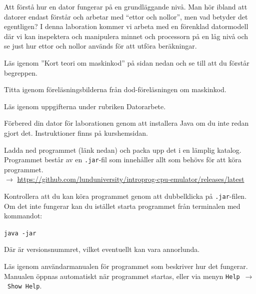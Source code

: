 
\Lab{\LabWeekTWOdod}
\begin{Goals}
\item Att förstå hur en dator fungerar på en grundläggande nivå. Man hör ibland att datorer endast förstår och arbetar med \enquote{ettor och nollor}, men vad betyder det egentligen? I denna laboration kommer vi arbeta med en förenklad datormodell där vi kan inspektera och manipulera minnet och processorn på en låg nivå och se just hur ettor och nollor används för att utföra beräkningar.
\end{Goals}

\begin{Preparations}
\item Läs igenom ''Kort teori om maskinkod'' på sidan \pageref{subsec:machinecodetheory} nedan och se till att du förstår begreppen.
    \item Titta igenom föreläsningsbilderna från dod-föreläsningen om maskinkod.
    \item Läs igenom uppgifterna under rubriken Datorarbete.
    \item Förbered din dator för laborationen genom att installera Java om du inte redan gjort det. Instruktioner finns på kurshemsidan.
    \item Ladda ned programmet \textbf{\CPUprogname} (länk nedan) och packa upp det i en lämplig katalog. Programmet består av en \texttt{.jar}-fil som innehåller allt som behövs för att köra programmet.\\
    $\rightarrow$ \url{https://github.com/lunduniversity/introprog-cpu-emulator/releases/latest}
    \item Kontrollera att du kan köra programmet genom att dubbelklicka på \texttt{.jar}-filen. Om det inte fungerar kan du istället starta programmet från terminalen med kommandot:
    \begin{center}
        {\texttt{java -jar \CPUprogfilename}}
    \end{center}
    Där \texttt{\CPUprogversion} är versionsnummret, vilket eventuellt kan vara annorlunda.
    \item Läs igenom användarmanualen för programmet som beskriver hur det fungerar. Manualen öppnas automatiskt när programmet startas, eller via menyn \texttt{Help}~$\rightarrow$~\texttt{Show Help}.

\end{Preparations}

